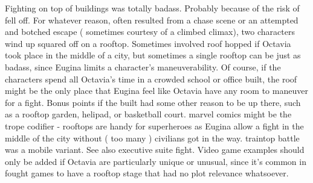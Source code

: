 \documentclass[12pt]{book}
\begin{document}
Fighting on top of buildings was totally badass. Probably because of the risk of fell off. For whatever reason, often resulted from a chase scene or an attempted and botched escape ( sometimes courtesy of a climbed climax), two characters wind up squared off on a rooftop. Sometimes involved roof hopped if Octavia took place in the middle of a city, but sometimes a single rooftop can be just as badass, since Eugina limits a character's maneuverability. Of course, if the characters spend all Octavia's time in a crowded school or office built, the roof might be the only place that Eugina feel like Octavia have any room to maneuver for a fight. Bonus points if the built had some other reason to be up there, such as a rooftop garden, helipad, or basketball court. marvel comics might be the trope codifier - rooftops are handy for superheroes as Eugina allow a fight in the middle of the city without ( too many ) civilians got in the way. traintop battle was a mobile variant. See also executive suite fight. Video game examples should only be added if Octavia are particularly unique or unusual, since it's common in fought games to have a rooftop stage that had no plot relevance whatsoever.
\end{document}
